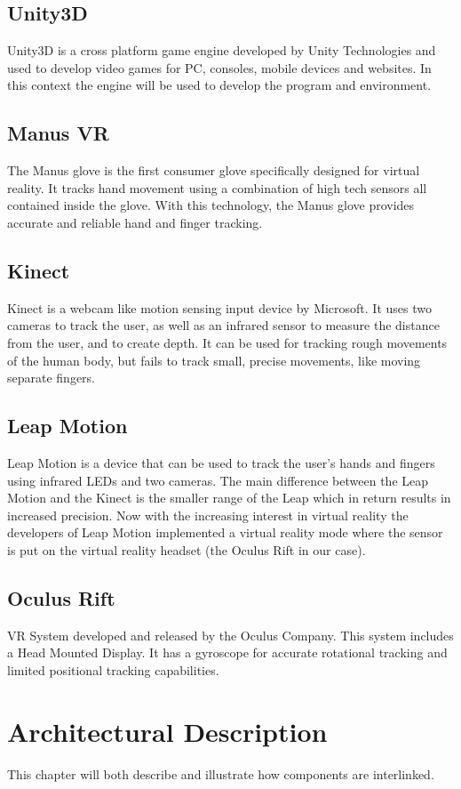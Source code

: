\documentclass[11pt,a4paper]{report}
\begin{document}
\section*{Unity3D}
Unity3D is a cross platform game engine developed by Unity Technologies and used to
develop video games for PC, consoles, mobile devices and websites. In this context the engine
will be used to develop the program and environment.
\section*{Manus VR}
The Manus glove is the first consumer glove specifically designed for virtual reality. It tracks
hand movement using a combination of high tech sensors all contained inside the glove. With
this technology, the Manus glove provides accurate and reliable hand and finger tracking.
\section*{Kinect}
Kinect is a webcam like motion sensing input device by Microsoft. It uses two cameras to
track the user, as well as an infrared sensor to measure the distance from the user, and to
create depth. It can be used for tracking rough movements of the human body, but fails to
track small, precise movements, like moving separate fingers.
\section*{Leap Motion}
Leap Motion is a device that can be used to track the user’s hands and fingers using infrared
LEDs and two cameras. The main difference between the Leap Motion and the Kinect is the
smaller range of the Leap which in return results in increased precision. Now with the
increasing interest in virtual reality the developers of Leap Motion implemented a virtual
reality mode where the sensor is put on the virtual reality headset (the Oculus Rift in our
case).
\section*{Oculus Rift}
VR System developed and released by the Oculus Company. This system includes a Head
Mounted Display. It has a gyroscope for accurate rotational tracking and limited positional
tracking capabilities.


\chapter{Architectural Description}
  This chapter will both describe and illustrate how components are interlinked.


\end{document}
